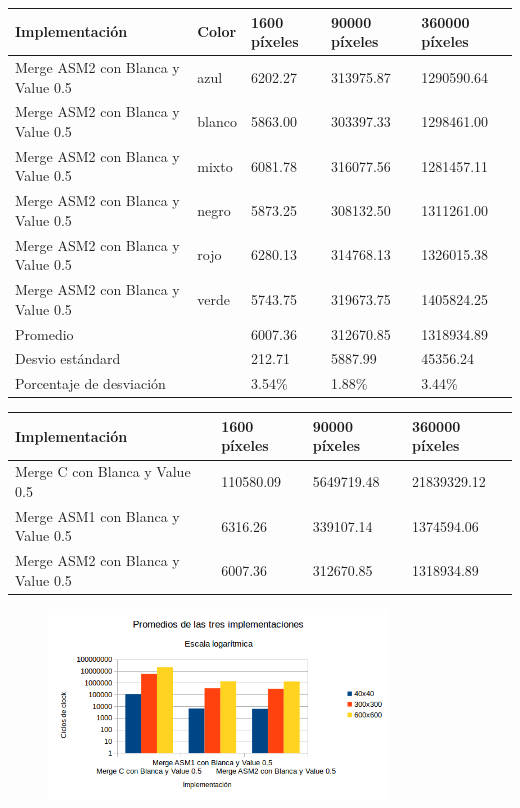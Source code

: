 \begin{tabular}{| l | l | l | l | l |}
\hline
Implementación & Color & 1600 píxeles & 90000 píxeles & 360000 píxeles\\
\hline
Merge ASM2 con Blanca y Value 0.5 & azul & 6202.27 &	313975.87	& 1290590.64\\ 
\hline
Merge ASM2 con Blanca y Value 0.5 & blanco & 5863.00 &	303397.33 & 	1298461.00\\ 
\hline
Merge ASM2 con Blanca y Value 0.5 & mixto & 6081.78	& 316077.56 &	1281457.11\\ 
\hline
Merge ASM2 con Blanca y Value 0.5 & negro & 5873.25	& 308132.50 &	1311261.00\\
\hline
Merge ASM2 con Blanca y Value 0.5 & rojo & 6280.13 &	314768.13	& 1326015.38\\
\hline
Merge ASM2 con Blanca y Value 0.5 & verde & 5743.75	& 319673.75	& 1405824.25\\ 
\hline
Promedio & &  6007.36 & 312670.85 &	1318934.89\\
\hline
Desvio estándard  && 212.71 &	5887.99 &	45356.24\\
\hline
Porcentaje de desviación  && 3.54\% &	1.88\% &	3.44\%\\
\hline
\end{tabular}

\begin{tabular}{| l | l | l | l|}
\hline
Implementación  & 1600 píxeles & 90000 píxeles & 360000 píxeles\\
\hline
Merge C con Blanca y Value 0.5  & 110580.09	& 5649719.48 &	21839329.12\\
\hline
Merge ASM1 con Blanca y Value 0.5  & 6316.26 &	339107.14 &	1374594.06\\
\hline
Merge ASM2 con Blanca y Value 0.5 & 6007.36 &	312670.85 &	1318934.89\\
\hline
\end{tabular}

\begin{figure}[ht]
\centering
\includegraphics[width=90mm]{merge/grafico_merge_conBlancas.png}
\end{figure}


